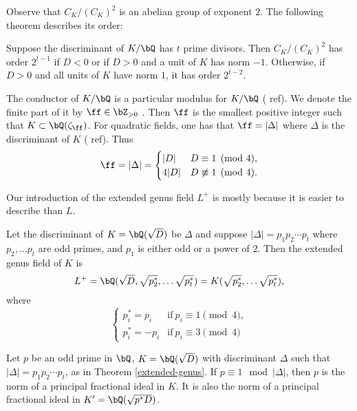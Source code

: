 Observe that $C_K / (C_K)^2$ is an abelian group of exponent $2$. The following theorem describes its order:

\begin{thm}\cite[Ch VI, \S3, Theorem 3.9]{Janusz}
Suppose the discriminant of $K / \bQ$ has $t$ prime divisors. Then $C_K / (C_K)^2$ has order $2^{t-1}$ if $D < 0$ or if $D > 0$ and a unit of $K$ has norm $-1$. Otherwise, if $D > 0$ and all units of $K$ have norm $1$, it has order $2^{t - 2}$.
\end{thm} 

\begin{rem}\label{conductor}
    The conductor of $K / \bQ$ is a particular modulus for $K / \bQ$ ({\color{red} ref}). We denote the finite part of it by $\ff \in \bZ_{>0}$ . Then $\ff$ is the smallest positive integer such that $K \subset \bQ(\zeta_{\ff})$. For quadratic fields, one has that $\ff = |\Delta|$ where $\Delta$ is the discriminant of $K$ ({\color{red} ref}). Thus
\[ \ff = |\Delta| =  \begin{cases} |D| & D \equiv 1 \pmod 4, \\ 4|D| & D \not\equiv 1 \pmod 4. \end{cases} \]
\end{rem}

Our introduction of the extended genus field $L^{+}$ is mostly because it is easier to describe than $L$.

\begin{thm}\label{extended-genus}\cite[Ch VI, \S3, Theorem 3.10]{Janusz}
Let the discriminant of $K = \bQ(\sqrt{D})$ be $\Delta$ and suppose $|\Delta| = p_1 p_2 \cdots p_t$ where $p_2, \ldots p_t$ are odd primes, and $p_1$ is either odd or a power of $2$. Then the extended genus field of $K$ is 
    \[ L^{+} = \bQ(\sqrt{D}, \sqrt{p_2^*}, \ldots \sqrt{p_t^*}) = K(\sqrt{p_2^*}, \ldots \sqrt{p_t^*}), \] 
where 
\[ \begin{cases}
    p_i^* = p_i & \mathrm{if }\ p_i \equiv 1 \pmod 4, \\
    p_i^* = -p_i & \mathrm{if }\ p_i \equiv 3 \pmod 4
\end{cases}\]
\end{thm} 

\vspace{1em}

\begin{cor}\label{p-one-mod-disc}
    Let $p$ be an odd prime in $\bQ$, $K = \bQ(\sqrt{D})$ with discriminant $\Delta$ such that $|\Delta| = p_1 p_2 \cdots p_t$, as in Theorem \ref{extended-genus}. If $p \equiv 1 \mod {|\Delta|}$, then $p$ is the norm of a principal fractional ideal in $K$. 
    It is also the norm of a principal fractional ideal in $K' = \bQ({\sqrt{p^*D}})$.
\end{cor}

